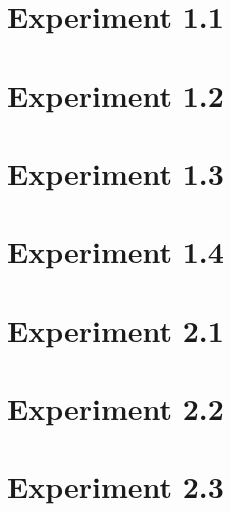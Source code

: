 




\sloppy



\section*{Experiment 1.1}

\clearpage
\section*{Experiment 1.2}

\clearpage
\section*{Experiment 1.3}

\clearpage
\section*{Experiment 1.4}

\clearpage



\section*{Experiment 2.1}

\clearpage
\section*{Experiment 2.2}

\clearpage
\section*{Experiment 2.3}

\clearpage



